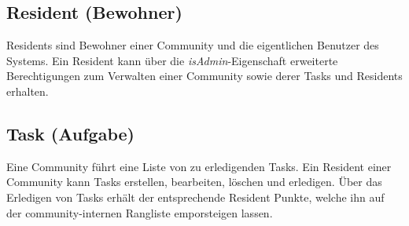 \subsection*{Resident (Bewohner)}
Residents sind Bewohner einer Community und die eigentlichen Benutzer des Systems. Ein Resident kann über die \emph{isAdmin}-Eigenschaft erweiterte Berechtigungen zum Verwalten einer Community sowie derer Tasks und Residents erhalten.

\subsection*{Task (Aufgabe)}
Eine Community führt eine Liste von zu erledigenden Tasks. Ein Resident einer Community kann Tasks erstellen, bearbeiten, löschen und erledigen. Über das Erledigen von Tasks erhält der entsprechende Resident Punkte, welche ihn auf der community-internen Rangliste emporsteigen lassen.